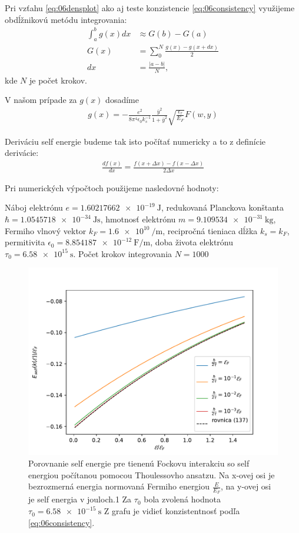 Pri vzťahu \eqref{eq:06densplot} ako aj teste konzistencie \eqref{eq:06consistency} využijeme obdĺžnikovú metódu integrovania:
\begin{align}
\int_a^b g(x)dx &\approx G(b)-G(a)\\
G(x) &= \sum_0^N \frac{g(x)-g(x+dx)}{2}\\
dx &= \frac{|a-b|}{N} \text{,}
\end{align}
kde $N$ je počet krokov.

V našom prípade za $g(x)$ dosadíme 
\begin{align}
g(x) = -\frac{e^2}{8\pi^4\epsilon_0 k_s^{-1}} \frac{\bar{y}^2}{1+\bar{y}^2}\sqrt{\frac{\epsilon_\tau}{E_F}}F(w,y)
\end{align}

Deriváciu self energie budeme tak isto počítať numericky a to z definície derivácie:
\begin{align}
\frac{df(x)}{d x} = \frac{f(x+\Delta x)-f(x-\Delta x)}{2\Delta x}
\end{align}

Pri numerických výpočtoch použijeme nasledovné hodnoty:

Náboj elektrónu $e = \SI{1.60217662e-19}{\joule}$, redukovaná Planckova konštanta $\hbar = \SI{1.0545718e-34}{\joule\second}$, hmotnosť elektrónu
 $m = \SI{9.109534e-31}{\kilo\gram}$, Fermiho vlnový vektor $k_F = \SI{1.6e10}{\per\meter}$, recipročná tieniaca dĺžka $k_s=k_F$, permitivita
 $ \epsilon_0 = \SI{8.854187e-12}{\farad\per\meter}$, doba života elektrónu $\tau_0 = \SI{6.58e15}{\second}$. Počet krokov integrovania $N=1000$
\begin{figure}[H]
\centering
\includegraphics[scale=1]{grafy/plot_se_test}
\caption{Porovnanie self energie pre tienenú Fockovu interakciu so self energiou počítanou pomocou Thoulessovho ansatzu. Na x-ovej osi je bezrozmerná energia normovaná Fermiho energiou $\frac{E}{E_F}$, na y-ovej osi je self energia v jouloch.1 Za $\tau_0$ bola zvolená hodnota $\tau_0=\SI{6.58e-15}{\second}$ Z grafu je vidieť konzistentnosť podľa \eqref{eq:06consistency}.}
\label{fig:plot_test} 
\end{figure}

